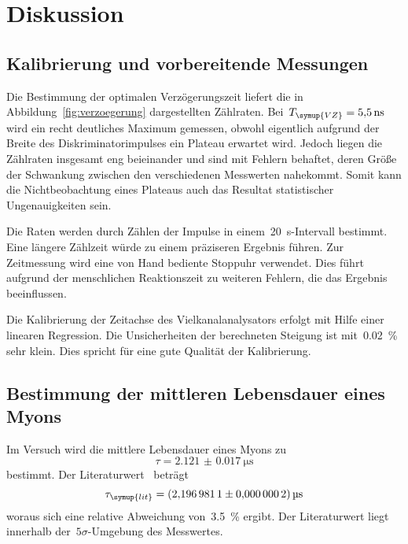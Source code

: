 \section{Diskussion}
\label{sec:diskussion}

\subsection{Kalibrierung und vorbereitende Messungen}

Die Bestimmung der optimalen Verzögerungszeit liefert die in
Abbildung~\ref{fig:verzoegerung} dargestellten Zählraten.
Bei~$T_{\symup{VZ}}=\SI{5.5}{\nano\second}$ wird ein recht deutliches Maximum
gemessen, obwohl eigentlich aufgrund der Breite des Diskriminatorimpulses ein
Plateau erwartet wird. Jedoch liegen die Zählraten insgesamt eng beieinander
und sind mit Fehlern behaftet, deren Größe der Schwankung zwischen den
verschiedenen Messwerten nahekommt. Somit kann die Nichtbeobachtung eines
Plateaus auch das Resultat statistischer Ungenauigkeiten sein.

Die Raten werden durch Zählen der Impulse in einem~\SI{20}{\second}-Intervall
bestimmt. Eine längere Zählzeit würde zu einem präziseren Ergebnis führen.
Zur Zeitmessung wird eine von Hand bediente Stoppuhr verwendet. Dies führt
aufgrund der menschlichen Reaktionszeit zu weiteren Fehlern, die das Ergebnis
beeinflussen.

Die Kalibrierung der Zeitachse des Vielkanalanalysators erfolgt mit Hilfe einer
linearen Regression. Die Unsicherheiten der berechneten Steigung ist
mit~\SI{0.02}{\percent} sehr klein. Dies spricht für eine gute Qualität der
Kalibrierung.

\subsection{Bestimmung der mittleren Lebensdauer eines Myons}

Im Versuch wird die mittlere Lebensdauer eines Myons zu
%
\begin{equation}
  \tau=\SI{2.121(17)}{\micro\second}
\end{equation}
%
bestimmt. Der Literaturwert~\cite[14]{pdg} beträgt
%
\begin{equation}
  \tau_{\symup{lit}}=\SI{2.1969811(2)}{\micro\second}
\end{equation}
%
woraus sich eine relative Abweichung von~\SI{3.5}{\percent} ergibt. Der
Literaturwert liegt innerhalb der~$5\sigma$-Umgebung des Messwertes.

